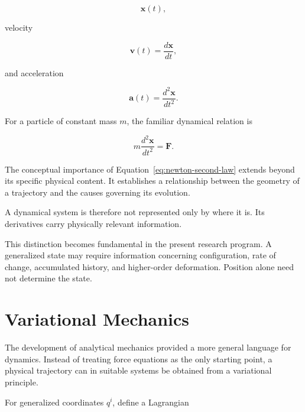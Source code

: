 \documentclass[12pt,oneside]{book}
\begin{document}
\begin{equation}
    \mathbf{x}(t),
\end{equation}

velocity

\begin{equation}
    \mathbf{v}(t)
    =
    \frac{d\mathbf{x}}{dt},
\end{equation}

and acceleration

\begin{equation}
    \mathbf{a}(t)
    =
    \frac{d^2\mathbf{x}}{dt^2}.
\end{equation}

For a particle of constant mass \(m\), the familiar dynamical
relation is

\begin{equation}
    m\frac{d^2\mathbf{x}}{dt^2}
    =
    \mathbf{F}.
    \label{eq:newton-second-law}
\end{equation}

The conceptual importance of
Equation~\eqref{eq:newton-second-law} extends beyond its
specific physical content. It establishes a relationship
between the geometry of a trajectory and the causes governing
its evolution.

A dynamical system is therefore not represented only by where
it is. Its derivatives carry physically relevant information.

This distinction becomes fundamental in the present research
program. A generalized state may require information concerning
configuration, rate of change, accumulated history, and
higher-order deformation. Position alone need not determine the
state.


\section{Variational Mechanics}
\label{sec:variational-mechanics}

The development of analytical mechanics provided a more general
language for dynamics. Instead of treating force equations as
the only starting point, a physical trajectory can in suitable
systems be obtained from a variational principle.

For generalized coordinates \(q^i\), define a Lagrangian
\end{document}
